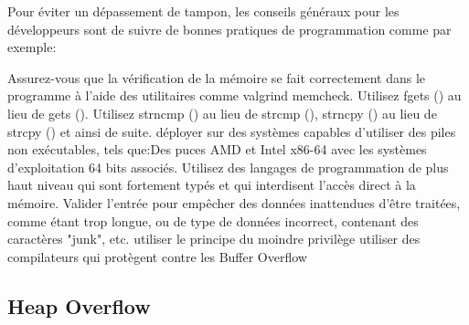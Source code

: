 \begin{flushleft}
Pour éviter un dépassement de tampon, les conseils généraux pour les développeurs sont de suivre de bonnes pratiques de programmation comme par exemple: 
\end{flushleft}
\begin{flushleft}
Assurez-vous que la vérification de la mémoire se fait correctement dans le programme à l'aide des utilitaires comme valgrind memcheck.
Utilisez fgets () au lieu de gets ().
Utilisez strncmp () au lieu de strcmp (), strncpy () au lieu de strcpy () et ainsi de suite. déployer sur des systèmes capables d'utiliser des piles non exécutables, tels que:Des puces AMD et Intel x86-64  avec les systèmes d'exploitation 64 bits associés.
Utilisez des langages de programmation de plus haut niveau qui sont fortement typés et qui interdisent l'accès direct à la mémoire.
Valider l'entrée pour empêcher  des données inattendues d'être traitées, comme étant trop longue, ou de type de données incorrect, contenant des caractères "junk", etc.
utiliser le principe du moindre privilège
utiliser des compilateurs qui protègent contre les Buffer Overflow 
\end{flushleft}

\subsection{Heap Overflow}\label{vulnerabilites:applicatives:buffer-overflow:heap}


